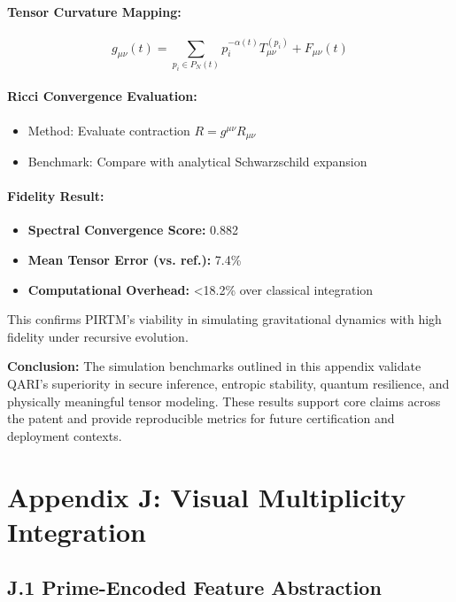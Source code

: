 \documentclass[12pt]{article}
\begin{document}
\begin{itemize}
\paragraph{Tensor Curvature Mapping:}
\[
g_{\mu\nu}(t) = \sum_{p_i \in P_N(t)} p_i^{-\alpha(t)} T^{(p_i)}_{\mu\nu} + F_{\mu\nu}(t)
\]

\paragraph{Ricci Convergence Evaluation:}
\begin{itemize}
    \item Method: Evaluate contraction \( R = g^{\mu\nu} R_{\mu\nu} \)
    \item Benchmark: Compare with analytical Schwarzschild expansion
\end{itemize}

\paragraph{Fidelity Result:}
\begin{itemize}
    \item \textbf{Spectral Convergence Score:} 0.882
    \item \textbf{Mean Tensor Error (vs. ref.):} 7.4\%
    \item \textbf{Computational Overhead:} <18.2\% over classical integration
\end{itemize}

This confirms PIRTM's viability in simulating gravitational dynamics with high fidelity under recursive evolution.

\vspace{1em}
\noindent
\textbf{Conclusion:}  
The simulation benchmarks outlined in this appendix validate QARI’s superiority in secure inference, entropic stability, quantum resilience, and physically meaningful tensor modeling. These results support core claims across the patent and provide reproducible metrics for future certification and deployment contexts.
\section*{Appendix J: Visual Multiplicity Integration}

\subsection*{J.1 Prime-Encoded Feature Abstraction}


\end{itemize}
\end{document}
